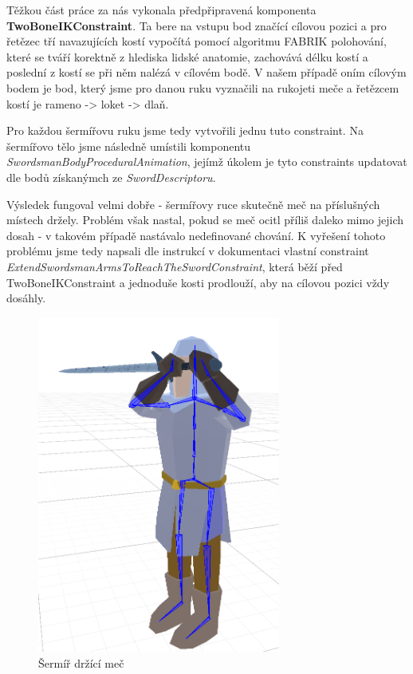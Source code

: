 Těžkou část práce za nás vykonala předpřipravená komponenta \textbf{TwoBoneIKConstraint}. Ta bere na vstupu bod značící cílovou pozici a pro řetězec tří navazujících kostí vypočítá pomocí algoritmu FABRIK \cite{FabrikSolverIK} polohování, které se tváří korektně z hlediska lidské anatomie, zachovává délku kostí a poslední z kostí se při něm nalézá v cílovém bodě. V našem případě oním cílovým bodem je bod, který jsme pro danou ruku vyznačili na rukojeti meče a řetězcem kostí je rameno -> loket -> dlaň.

Pro každou šermířovu ruku jsme tedy vytvořili jednu tuto constraint. Na šermířovo tělo jsme následně umístili komponentu \textit{SwordsmanBodyProceduralAnimation}, jejímž úkolem je tyto constraints updatovat dle bodů získanýmch ze \textit{SwordDescriptoru}. 

Výsledek fungoval velmi dobře - šermířovy ruce skutečně meč na příslušných místech držely. Problém však nastal, pokud se meč ocitl příliš daleko mimo jejich dosah - v takovém případě nastávalo nedefinované chování. K vyřešení tohoto problému jsme tedy napsali dle instrukcí v dokumentaci vlastní constraint \textit{ExtendSwordsmanArmsToReachTheSwordConstraint}, která běží před TwoBoneIKConstraint a jednoduše kosti prodlouží, aby na cílovou pozici vždy dosáhly.


\begin{figure}[ht]\centering
  \center
  \includegraphics[width=80mm]{../img/swordsmanProceduralAnimation.png}
  \caption{Šermíř držící meč}
  \label{obr05:swordsmanProceduralAnimation}
\end{figure} 


